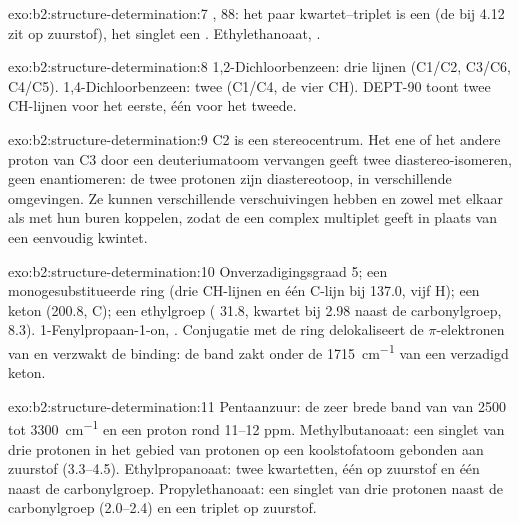\begin{solution}{exo:b2:structure-determination:7}
, 88: het paar kwartet--triplet is een  (de  bij 4.12 zit op zuurstof), het
singlet een . Ethylethanoaat, .
\end{solution}

\begin{solution}{exo:b2:structure-determination:8}
1,2-Dichloorbenzeen: drie lijnen (C1/C2, C3/C6, C4/C5). 1,4-Dichloorbenzeen: twee (C1/C4, de vier
CH). DEPT-90 toont twee CH-lijnen voor het eerste, één voor het tweede.
\end{solution}

\begin{solution}{exo:b2:structure-determination:9}
C2 is een stereocentrum. Het ene of het andere proton van C3 door een deuteriumatoom vervangen geeft twee
diastereo-isomeren, geen enantiomeren: de twee protonen zijn diastereotoop, in verschillende omgevingen.
Ze kunnen verschillende verschuivingen hebben en zowel met elkaar als met hun buren koppelen, zodat de
 een complex multiplet geeft in plaats van een eenvoudig kwintet.
\end{solution}

\begin{solution}{exo:b2:structure-determination:10}
Onverzadigingsgraad 5; een monogesubstitueerde ring (drie CH-lijnen en één C-lijn bij 137.0, vijf 
H); een keton (200.8, C); een ethylgroep ( 31.8, kwartet bij 2.98 naast de carbonylgroep, 
8.3). 1-Fenylpropaan-1-on, . Conjugatie met de ring delokaliseert de $\pi$-elektronen van 
en verzwakt de binding: de band zakt onder de \qty{1715}{cm^{-1}} van een verzadigd keton.
\end{solution}

\begin{solution}{exo:b2:structure-determination:11}
Pentaanzuur: de zeer brede band van  van 2500 tot \qty{3300}{cm^{-1}} en een proton rond 11--12
ppm. Methylbutanoaat: een singlet van drie protonen in het gebied van protonen op een koolstofatoom gebonden aan zuurstof
(3.3--4.5). Ethylpropanoaat: twee kwartetten, één op zuurstof en één naast de carbonylgroep.
Propylethanoaat: een singlet van drie protonen naast de carbonylgroep (2.0--2.4) en een triplet op zuurstof.
\end{solution}

